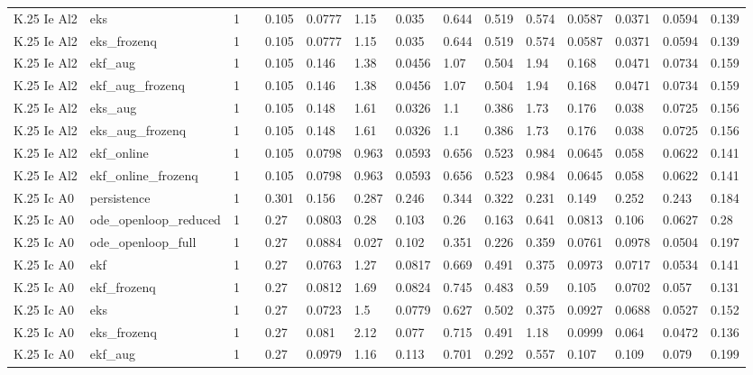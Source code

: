 \begin{table}[t]
\begin{tabular}{lllllllllllllll}
K.25 Ie Al2 & eks & 1 &  & 0.105 & 0.0777 & 1.15 & 0.035 & 0.644 & 0.519 & 0.574 & 0.0587 & 0.0371 & 0.0594 & 0.139 \\
K.25 Ie Al2 & eks\_frozenq & 1 &  & 0.105 & 0.0777 & 1.15 & 0.035 & 0.644 & 0.519 & 0.574 & 0.0587 & 0.0371 & 0.0594 & 0.139 \\
K.25 Ie Al2 & ekf\_aug & 1 &  & 0.105 & 0.146 & 1.38 & 0.0456 & 1.07 & 0.504 & 1.94 & 0.168 & 0.0471 & 0.0734 & 0.159 \\
K.25 Ie Al2 & ekf\_aug\_frozenq & 1 &  & 0.105 & 0.146 & 1.38 & 0.0456 & 1.07 & 0.504 & 1.94 & 0.168 & 0.0471 & 0.0734 & 0.159 \\
K.25 Ie Al2 & eks\_aug & 1 &  & 0.105 & 0.148 & 1.61 & 0.0326 & 1.1 & 0.386 & 1.73 & 0.176 & 0.038 & 0.0725 & 0.156 \\
K.25 Ie Al2 & eks\_aug\_frozenq & 1 &  & 0.105 & 0.148 & 1.61 & 0.0326 & 1.1 & 0.386 & 1.73 & 0.176 & 0.038 & 0.0725 & 0.156 \\
K.25 Ie Al2 & ekf\_online & 1 &  & 0.105 & 0.0798 & 0.963 & 0.0593 & 0.656 & 0.523 & 0.984 & 0.0645 & 0.058 & 0.0622 & 0.141 \\
K.25 Ie Al2 & ekf\_online\_frozenq & 1 &  & 0.105 & 0.0798 & 0.963 & 0.0593 & 0.656 & 0.523 & 0.984 & 0.0645 & 0.058 & 0.0622 & 0.141 \\
K.25 Ic A0 & persistence & 1 &  & 0.301 & 0.156 & 0.287 & 0.246 & 0.344 & 0.322 & 0.231 & 0.149 & 0.252 & 0.243 & 0.184 \\
K.25 Ic A0 & ode\_openloop\_reduced & 1 &  & 0.27 & 0.0803 & 0.28 & 0.103 & 0.26 & 0.163 & 0.641 & 0.0813 & 0.106 & 0.0627 & 0.28 \\
K.25 Ic A0 & ode\_openloop\_full & 1 &  & 0.27 & 0.0884 & 0.027 & 0.102 & 0.351 & 0.226 & 0.359 & 0.0761 & 0.0978 & 0.0504 & 0.197 \\
K.25 Ic A0 & ekf & 1 &  & 0.27 & 0.0763 & 1.27 & 0.0817 & 0.669 & 0.491 & 0.375 & 0.0973 & 0.0717 & 0.0534 & 0.141 \\
K.25 Ic A0 & ekf\_frozenq & 1 &  & 0.27 & 0.0812 & 1.69 & 0.0824 & 0.745 & 0.483 & 0.59 & 0.105 & 0.0702 & 0.057 & 0.131 \\
K.25 Ic A0 & eks & 1 &  & 0.27 & 0.0723 & 1.5 & 0.0779 & 0.627 & 0.502 & 0.375 & 0.0927 & 0.0688 & 0.0527 & 0.152 \\
K.25 Ic A0 & eks\_frozenq & 1 &  & 0.27 & 0.081 & 2.12 & 0.077 & 0.715 & 0.491 & 1.18 & 0.0999 & 0.064 & 0.0472 & 0.136 \\
K.25 Ic A0 & ekf\_aug & 1 &  & 0.27 & 0.0979 & 1.16 & 0.113 & 0.701 & 0.292 & 0.557 & 0.107 & 0.109 & 0.079 & 0.199 \\

\end{tabular}
\end{table}
